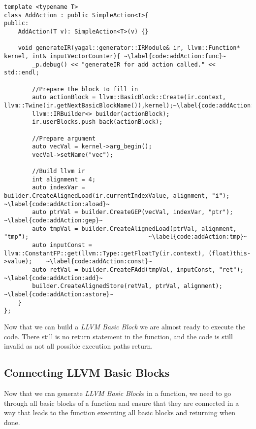 \begin{lstlisting}[caption={The AddAction class.}, label={code:addAction}]
template <typename T>
class AddAction : public SimpleAction<T>{
public:
    AddAction(T v): SimpleAction<T>(v) {}

    void generateIR(yagal::generator::IRModule& ir, llvm::Function* kernel, int& inputVectorCounter){ ~\label{code:addAction:func}~
        _p.debug() << "generateIR for add action called." << std::endl;

        //Prepare the block to fill in
        auto actionBlock = llvm::BasicBlock::Create(ir.context, llvm::Twine(ir.getNextBasicBlockName()),kernel);~\label{code:addAction:bbc}~
        llvm::IRBuilder<> builder(actionBlock);
        ir.userBlocks.push_back(actionBlock);

        //Prepare argument
        auto vecVal = kernel->arg_begin();
        vecVal->setName("vec");

        //Build llvm ir
        int alignment = 4;
        auto indexVar = builder.CreateAlignedLoad(ir.currentIndexValue, alignment, "i");                    ~\label{code:addAction:aload}~
        auto ptrVal = builder.CreateGEP(vecVal, indexVar, "ptr");                                           ~\label{code:addAction:gep}~
        auto tmpVal = builder.CreateAlignedLoad(ptrVal, alignment, "tmp");                                  ~\label{code:addAction:tmp}~
        auto inputConst = llvm::ConstantFP::get(llvm::Type::getFloatTy(ir.context), (float)this->value);    ~\label{code:addAction:const}~
        auto retVal = builder.CreateFAdd(tmpVal, inputConst, "ret");                                        ~\label{code:addAction:add}~
        builder.CreateAlignedStore(retVal, ptrVal, alignment);                                              ~\label{code:addAction:astore}~
    }
};
\end{lstlisting}

Now that we can build a \textit{LLVM Basic Block} we are almost ready to execute the code. There still is no return statement in the function, and the code is still invalid as not all possible execution paths return.

\subsection{Connecting LLVM Basic Blocks} \label{sec:bblinking}
Now that we can generate \textit{LLVM Basic Block}s in a function, we need to go through all basic blocks of a function and ensure that they are connected in a way that leads to the function executing all basic blocks and returning when done.

